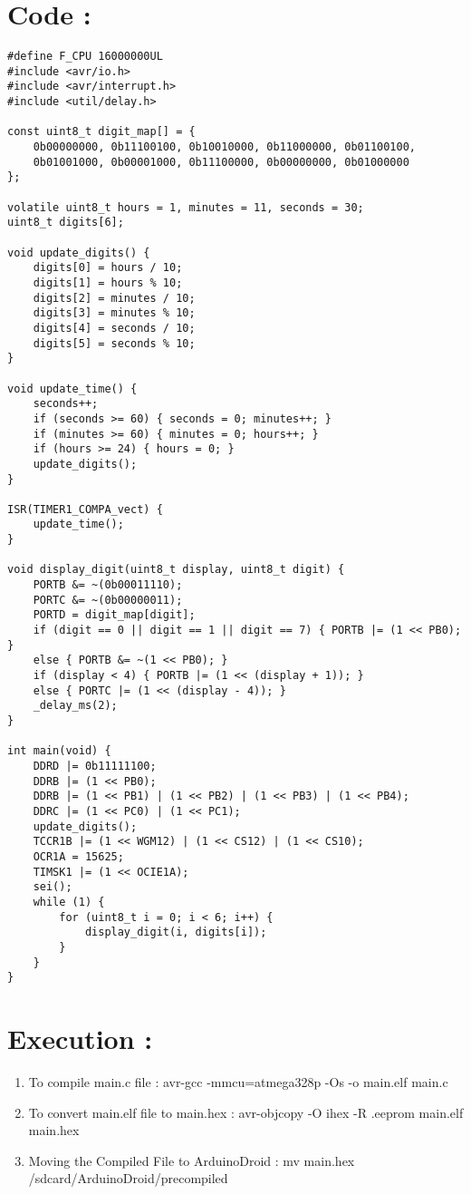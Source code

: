 \documentclass{article}
\begin{document}

\section{Code : }
\begin{tcolorbox}[colback=green!10, colframe=green!50!black, breakable]
\begin{verbatim}
#define F_CPU 16000000UL
#include <avr/io.h>
#include <avr/interrupt.h>
#include <util/delay.h>

const uint8_t digit_map[] = {
    0b00000000, 0b11100100, 0b10010000, 0b11000000, 0b01100100,
    0b01001000, 0b00001000, 0b11100000, 0b00000000, 0b01000000
};

volatile uint8_t hours = 1, minutes = 11, seconds = 30;
uint8_t digits[6];

void update_digits() {
    digits[0] = hours / 10;
    digits[1] = hours % 10;
    digits[2] = minutes / 10;
    digits[3] = minutes % 10;
    digits[4] = seconds / 10;
    digits[5] = seconds % 10;
}

void update_time() {
    seconds++;
    if (seconds >= 60) { seconds = 0; minutes++; }
    if (minutes >= 60) { minutes = 0; hours++; }
    if (hours >= 24) { hours = 0; }
    update_digits();
}

ISR(TIMER1_COMPA_vect) {
    update_time();
}

void display_digit(uint8_t display, uint8_t digit) {
    PORTB &= ~(0b00011110);
    PORTC &= ~(0b00000011);
    PORTD = digit_map[digit];
    if (digit == 0 || digit == 1 || digit == 7) { PORTB |= (1 << PB0); }
    else { PORTB &= ~(1 << PB0); }
    if (display < 4) { PORTB |= (1 << (display + 1)); }
    else { PORTC |= (1 << (display - 4)); }
    _delay_ms(2);
}

int main(void) {
    DDRD |= 0b11111100;
    DDRB |= (1 << PB0);
    DDRB |= (1 << PB1) | (1 << PB2) | (1 << PB3) | (1 << PB4);
    DDRC |= (1 << PC0) | (1 << PC1);
    update_digits();
    TCCR1B |= (1 << WGM12) | (1 << CS12) | (1 << CS10);
    OCR1A = 15625;
    TIMSK1 |= (1 << OCIE1A);
    sei();
    while (1) {
        for (uint8_t i = 0; i < 6; i++) {
            display_digit(i, digits[i]);
        }
    }
}
\end{verbatim}
\end{tcolorbox}

\section{Execution : }
\begin{enumerate}
    \item To compile main.c file : avr-gcc -mmcu=atmega328p -Os -o main.elf main.c
    \item To convert main.elf file to main.hex : avr-objcopy -O ihex -R .eeprom main.elf main.hex
    \item Moving the Compiled File to ArduinoDroid : mv main.hex /sdcard/ArduinoDroid/precompiled
\end{enumerate}
\end{document}

